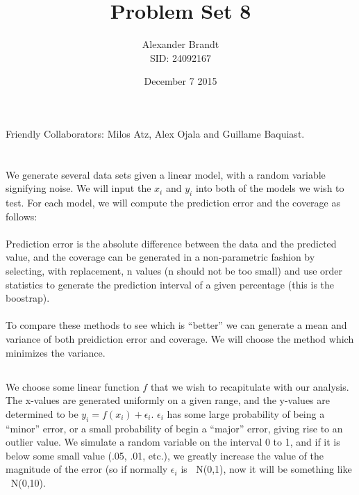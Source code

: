 \documentclass{article}\usepackage[]{graphicx}\usepackage[]{color}
\title{Problem Set 8}
\author{Alexander Brandt\\SID: 24092167}
\date{December 7 2015}
\begin{document}
\maketitle

Friendly Collaborators: Milos Atz, Alex Ojala and Guillame Baquiast.

\section{}

\subsection{}

We generate several data sets given a linear model, with a random variable signifying noise.   We will input the \(x_i\) and \(y_i\) into both of the models we wish to test.  For each model, we will compute the prediction error and the coverage as follows:
\\\\
Prediction error is the absolute difference between the data and the predicted value, and the coverage can be generated in a non-parametric fashion by selecting, with replacement, n values (n should not be too small) and use order statistics to generate the prediction interval of a given percentage (this is the boostrap).
\\\\
To compare these methods to see which is ``better'' we can generate a mean and variance of both preidiction error and coverage.  We will choose the method which minimizes the variance.
\subsection{}

We choose some linear function \(f\) that we wish to recapitulate with our analysis.  The x-values are generated uniformly on a given range, and the y-values are determined to be \(y_i = f(x_i) + \epsilon_i\).  \(\epsilon_i\) has some large probability of being a ``minor'' error, or a small probability of begin a ``major'' error, giving rise to an outlier value.  We simulate a random variable on the interval 0 to 1, and if it is below some small value (.05, .01, etc.), we greatly increase the value of the magnitude of the error (so if normally \(\epsilon_i\) is \(~\) N(0,1), now it will be something like \(~\) N(0,10).

\section{}
\end{document}
